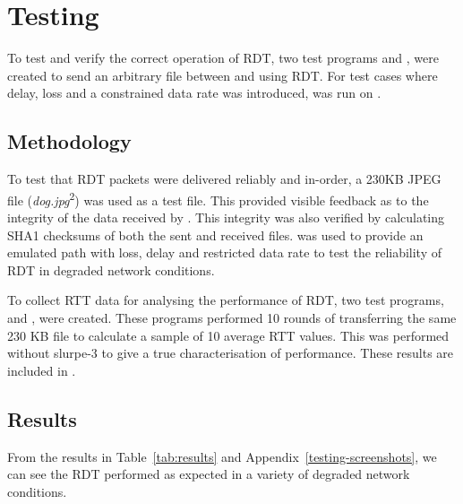 \section{Testing}

To test and verify the correct operation of RDT, two test programs  and , were created to send an arbitrary file between  and  using RDT. For test cases where delay, loss and a constrained data rate was introduced,  was run on .

\subsection{Methodology}

To test that RDT packets were delivered reliably and in-order, a 230KB JPEG file (\emph{dog.jpg}\textsuperscript{2}) was used as a test file. This provided visible feedback as to the integrity of the data received by . This integrity was also verified by calculating SHA1 checksums of both the sent and received files.  was used to provide an emulated path with loss, delay and restricted data rate to test the reliability of RDT in degraded network conditions.

To collect RTT data for analysing the performance of RDT, two test programs,  and , were created. These programs performed 10 rounds of transferring the same 230 KB file to calculate a sample of 10 average RTT values. This was performed without slurpe-3 to give a true characterisation of performance. These results are included in .

\subsection{Results}

From the results in Table~\ref{tab:results} and Appendix~\ref{testing-screenshots}, we can see the RDT performed as expected in a variety of degraded network conditions. 

